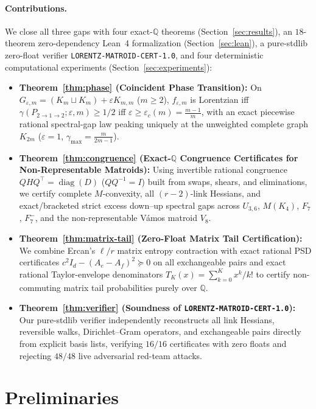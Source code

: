\documentclass[11pt,a4paper]{article}
\theoremstyle{definition}
\theoremstyle{remark}
\newcommand{\QQ}{\mathbb{Q}}
\newcommand{\diag}{\operatorname{diag}}
\newcommand{\certschema}{\texttt{LORENTZ-MATROID-CERT-1.0}}
\begin{document}
\paragraph{Contributions.} We close all three gaps with four exact-$\QQ$ theorems (Section~\ref{sec:results}), an $18$-theorem zero-dependency Lean~4 formalization (Section~\ref{sec:lean}), a pure-stdlib zero-float verifier \certschema{}, and four deterministic computational experiments (Section~\ref{sec:experiments}):
\begin{itemize}[leftmargin=1.6em,itemsep=2pt]
  \item \textbf{Theorem~\ref{thm:phase} (Coincident Phase Transition):} On $G_{\varepsilon,m} = (K_m \sqcup K_m) + \varepsilon K_{m,m}$ ($m \ge 2$), $f_{\varepsilon,m}$ is Lorentzian iff $\gamma(P_{2\to 1\to 2}; \varepsilon,m) \ge 1/2$ iff $\varepsilon \ge \varepsilon_c(m) = \frac{m-1}{m}$, with an exact piecewise rational spectral-gap law peaking uniquely at the unweighted complete graph $K_{2m}$ ($\varepsilon = 1$, $\gamma_{\max} = \frac{m}{2m-1}$).
  \item \textbf{Theorem~\ref{thm:congruence} (Exact-$\QQ$ Congruence Certificates for Non-Representable Matroids):} Using invertible rational congruence $Q H Q^\top = \diag(D)$ ($Q Q^{-1} = I$) built from swaps, shears, and eliminations, we certify complete $M$-convexity, all $(r-2)$-link Hessians, and exact/bracketed strict excess down--up spectral gaps across $U_{3,6}$, $M(K_4)$, $F_7$, $F_7^-$, and the non-representable V\'amos matroid $V_8$.
  \item \textbf{Theorem~\ref{thm:matrix-tail} (Zero-Float Matrix Tail Certification):} We combine Ercan's $\ell/r$ matrix entropy contraction with exact rational PSD certificates $c^2 I_d - (A_e - A_f)^2 \succeq 0$ on all exchangeable pairs and exact rational Taylor-envelope denominators $T_K(x) = \sum_{k=0}^K x^k/k!$ to certify non-commuting matrix tail probabilities purely over $\QQ$.
  \item \textbf{Theorem~\ref{thm:verifier} (Soundness of \certschema{}):} Our pure-stdlib verifier independently reconstructs all link Hessians, reversible walks, Dirichlet--Gram operators, and exchangeable pairs directly from explicit basis lists, verifying $16/16$ certificates with zero floats and rejecting $48/48$ live adversarial red-team attacks.
\end{itemize}

\section{Preliminaries}\label{sec:prelim}
\end{document}
